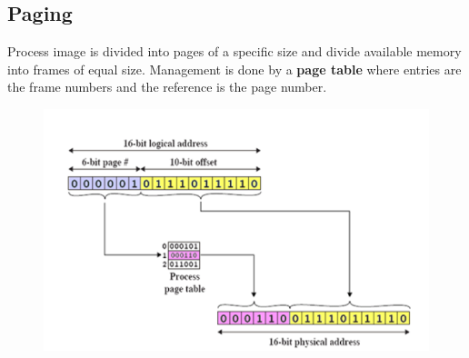 	\subsection{Paging }
		Process image is divided into pages of a specific size and divide available memory into frames of equal size. Management is done by a \textbf{page table} where entries are the frame numbers and the reference is the page number. 
		
		\begin{figure}[H]\centering
			\includegraphics[scale=0.8]{./pictures/pagingAddressTrans.png}
		\end{figure}	
		